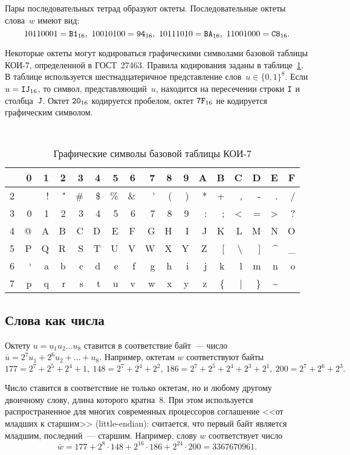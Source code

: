 Пары последовательных тетрад образуют октеты.
Последовательные октеты слова~$w$ имеют вид:
$$
1011 0001=\hex{B1},\ 
1001 0100=\hex{94},\ 
1011 1010=\hex{BA},\  
1100 1000=\hex{C8}.
$$

Некоторые октеты могут кодироваться графическими символами базовой 
таблицы КОИ-7, определенной в ГОСТ~27463. 
Правила кодирования заданы в таблице~\ref{Table.ASCII}.
%
В таблице используется шестнадцатеричное представление 
слов~$u\in\{0,1\}^8$. Если $u=\texttt{IJ}_{16}$, то символ, 
представляющий~$u$, находится на пересечении строки $\texttt{I}$ и 
столбца~$\texttt{J}$. 
%
Октет $\texttt{20}_{16}$ кодируется пробелом,
октет $\texttt{7F}_{16}$ не кодируется графическим символом.

\begin{table}[bht]
\caption{Графические символы базовой таблицы КОИ-7}\label{Table.ASCII}
{\small\tt
{\tabcolsep=8.5pt
\begin{tabular}{|l|rrrrrrrrrrrrrrrr|}
\hline
 &  0&  1&  2&  3&  4&  5&  6&  7&  8&  9&  A&  B&  C&  D&  E&  F\\
\hline
2&   &  !&  "&  \#& \$& \%& \&&  '&  (&  )&  *&  +&  ,&  -&  .&  /\\
3&  0&  1&  2&  3&  4&  5&  6&  7&  8&  9&  :&  ;&  <&  =&  >&  ?\\
4&  @&  A&  B&  C&  D&  E&  F&  G&  H&  I&  J&  K&  L&  M&  N&  O\\
5&  P&  Q&  R&  S&  T&  U&  V&  W&  X&  Y&  Z&  [& \textbackslash &]&\textasciicircum&\_\\
6&  `&  a&  b&  c&  d&  e&  f&  g&  h&  i&  j&  k&  l&  m&  n&  o\\
7&  p&  q&  r&  s&  t&  u&  v&  w&  x&  y&  z& \{&  |& \}&  \textasciitilde&   \\
\hline
\end{tabular}
} %
} %
\end{table}

\subsection{Слова как числа}

Октету $u=u_1 u_2\ldots u_8$ ставится в соответствие байт~--- 
число $\bar{u}=2^7u_1+2^6 u_2+\ldots + u_8$. 
Например, октетам $w$ соответствуют байты
$$
177=2^7+2^5+2^4+1,\ 
148=2^7+2^4+2^2,\ 
186=2^7+2^5+2^4+2^3+2^1,\ 
200=2^7+2^6+2^3.
$$

Число ставится в соответствие не только октетам, но и любому другому
двоичному слову, длина которого кратна~$8$. 
%
При этом используется распространенное для многих современных 
процессоров соглашение <<от младших к старшим>> (little-endian):
считается, что первый байт является младшим, последний~--- старшим.
Например, слову $w$ соответствует число
$$
\bar{w}=177+2^{8}\cdot 148+2^{16}\cdot 186+2^{24}\cdot 200 = 3367670961.
$$



